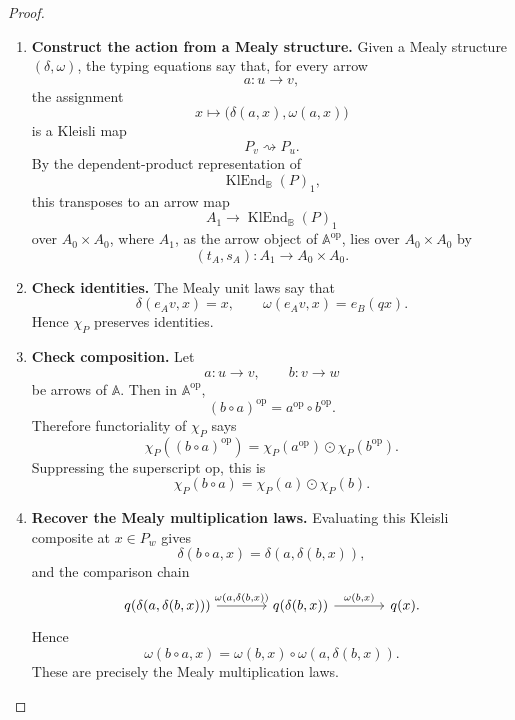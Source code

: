 \begin{proof}
    \leavevmode
    \begin{enumerate}
        \item \textbf{Construct the action from a Mealy structure.}
        Given a Mealy structure \((\delta,\omega)\), the typing equations say
        that, for every arrow
        \[
            a:u\to v,
        \]
        the assignment
        \[
            x\longmapsto
            \bigl(\delta(a,x),\omega(a,x)\bigr)
        \]
        is a Kleisli map
        \[
            P_v\rightsquigarrow P_u.
        \]
        By the dependent-product representation of
        \[
            \operatorname{KlEnd}_{\mathbb B}(P)_1,
        \]
        this transposes to an arrow map
        \[
            A_1\to\operatorname{KlEnd}_{\mathbb B}(P)_1
        \]
        over \(A_0\times A_0\), where \(A_1\), as the arrow object of
        \(\mathbb A^{\mathrm{op}}\), lies over \(A_0\times A_0\) by
        \[
            (t_A,s_A):A_1\to A_0\times A_0.
        \]

        \item \textbf{Check identities.}
        The Mealy unit laws say that
        \[
            \delta(e_Av,x)=x,
            \qquad
            \omega(e_Av,x)=e_B(qx).
        \]
        Hence \(\chi_P\) preserves identities.

        \item \textbf{Check composition.}
        Let
        \[
            a:u\to v,
            \qquad
            b:v\to w
        \]
        be arrows of \(\mathbb A\). Then in \(\mathbb A^{\mathrm{op}}\),
        \[
            (b\circ a)^{\mathrm{op}}
            =
            a^{\mathrm{op}}\circ b^{\mathrm{op}}.
        \]
        Therefore functoriality of \(\chi_P\) says
        \[
            \chi_P((b\circ a)^{\mathrm{op}})
            =
            \chi_P(a^{\mathrm{op}})\odot\chi_P(b^{\mathrm{op}}).
        \]
        Suppressing the superscript \({\mathrm{op}}\), this is
        \[
            \chi_P(b\circ a)
            =
            \chi_P(a)\odot\chi_P(b).
        \]

        \item \textbf{Recover the Mealy multiplication laws.}
        Evaluating this Kleisli composite at \(x\in P_w\) gives
        \[
            \delta(b\circ a,x)
            =
            \delta(a,\delta(b,x)),
        \]
        and the comparison chain
        \[
        \begin{tikzcd}[column sep=large, row sep=large]
            q(\delta(a,\delta(b,x)))
                \arrow[r, "{\omega(a,\delta(b,x))}"]
            &
            q(\delta(b,x))
                \arrow[r, "{\omega(b,x)}"]
            &
            q(x).
        \end{tikzcd}
        \]
        Hence
        \[
            \omega(b\circ a,x)
            =
            \omega(b,x)\circ\omega(a,\delta(b,x)).
        \]
        These are precisely the Mealy multiplication laws.


\end{enumerate}
\end{proof}
